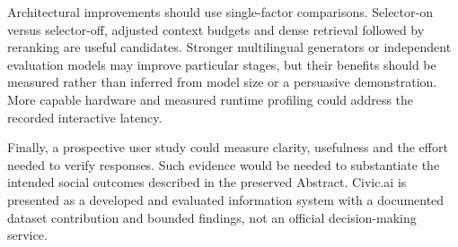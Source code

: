 Architectural improvements should use single-factor comparisons. Selector-on versus selector-off, adjusted context budgets and dense retrieval followed by reranking are useful candidates. Stronger multilingual generators or independent evaluation models may improve particular stages, but their benefits should be measured rather than inferred from model size or a persuasive demonstration. More capable hardware and measured runtime profiling could address the recorded interactive latency.

Finally, a prospective user study could measure clarity, usefulness and the effort needed to verify responses. Such evidence would be needed to substantiate the intended social outcomes described in the preserved Abstract. Civic.ai is presented as a developed and evaluated information system with a documented dataset contribution and bounded findings, not an official decision-making service.
